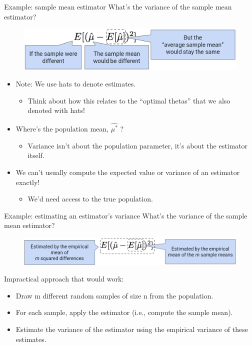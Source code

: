\documentclass[aspectratio=169]{../latex_main/tntbeamer}  %
\begin{document}
	
	\begin{frame}{Example: sample mean estimator}
	    What’s the variance of the sample mean estimator?
	    \begin{figure}
	        \centering
	        \includegraphics[scale=.45]{Bild1}
	    \end{figure}
	    \begin{itemize}
	        \item Note: We use hats to denote estimates.
	        \begin{itemize}
	            \item Think about how this relates to the “optimal thetas” that we also denoted with hats! 
	        \end{itemize}
	        \item Where’s the population mean,   $\hat{\mu^*}$    ?
	        \begin{itemize}
	            \item Variance isn’t about the population parameter, it’s about the estimator itself.
	        \end{itemize}
	        \item We can’t usually compute the expected value or variance of an estimator exactly!
	        \begin{itemize}
	            \item We’d need access to the true population.
	        \end{itemize}
	    \end{itemize}
	\end{frame}
	
	
	\begin{frame}{Example: estimating an estimator’s variance}
	    What’s the variance of the sample mean estimator?
	    \begin{figure}
	        \centering
	        \includegraphics[scale=.4]{Bild2}
	    \end{figure}
	    Impractical approach that would work:
	    \begin{itemize}
	        \item Draw m different random samples of size n from the population.
	        \item For each sample, apply the estimator (i.e., compute the sample mean).
	        \item Estimate the variance of the estimator using the empirical variance of these estimates.
	    \end{itemize}
	\end{frame}
	
\end{document}
